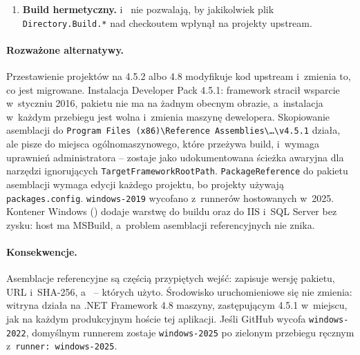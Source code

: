 \begin{enumerate}
    nopCommerce mówi: przebuduj rozwiązanie, potem opublikuj \texttt{Nop.Web} w~Release.
    Krok~2 robi dokładnie to z~wiersza poleceń (publikacja webowa do systemu plików
    z~\texttt{DeployDefaultTarget=WebPublish}). \texttt{Nop.Web.csproj} ustawia
    \texttt{FilesToIncludeForPublish=AllFilesInProjectFolder} i~własną listę wykluczeń,
    więc opublikowany katalog zawiera już zbudowane wtyczki () i~obszar
    Administration, bez plików źródłowych,  i~plików stanu instalacji.
  \item \textbf{Build hermetyczny.} 
    i~ nie pozwalają, by jakikolwiek plik
    \texttt{Directory.Build.*} nad checkoutem wpłynął na projekty upstream.
\end{enumerate}

\paragraph{Rozważone alternatywy.} Przestawienie projektów na 4.5.2 albo 4.8 modyfikuje
kod upstream i~zmienia to, co jest migrowane. Instalacja Developer Pack 4.5.1: framework
stracił wsparcie w~styczniu 2016, pakietu nie ma na żadnym obecnym obrazie, a~instalacja
w~każdym przebiegu jest wolna i~zmienia maszynę dewelopera. Skopiowanie asemblacji do
\texttt{Program Files (x86)\textbackslash{}Reference Assemblies\textbackslash{}…\textbackslash{}v4.5.1}
działa, ale pisze do miejsca ogólnomaszynowego, które przeżywa build, i~wymaga uprawnień
administratora -- zostaje jako udokumentowana ścieżka awaryjna dla narzędzi ignorujących
\texttt{TargetFrameworkRootPath}. \texttt{PackageReference} do pakietu asemblacji wymaga
edycji każdego projektu, bo projekty używają \texttt{packages.config}.
\texttt{windows-2019} wycofano z~runnerów hostowanych w~2025. Kontener Windows
() dodaje warstwę do buildu oraz do IIS
i~SQL Server bez zysku: host ma MSBuild, a~problem asemblacji referencyjnych nie znika.

\paragraph{Konsekwencje.} Asemblacje referencyjne są częścią przypiętych wejść:
 zapisuje wersję pakietu, URL i~SHA-256, a~ --
których użyto. Środowisko uruchomieniowe się nie zmienia: witryna działa na .NET Framework
4.8 maszyny, zastępującym 4.5.1 w~miejscu, jak na każdym produkcyjnym hoście tej
aplikacji. Jeśli GitHub wycofa \texttt{windows-2022}, domyślnym runnerem zostaje
\texttt{windows-2025} po zielonym przebiegu ręcznym z~\texttt{runner: windows-2025}.

